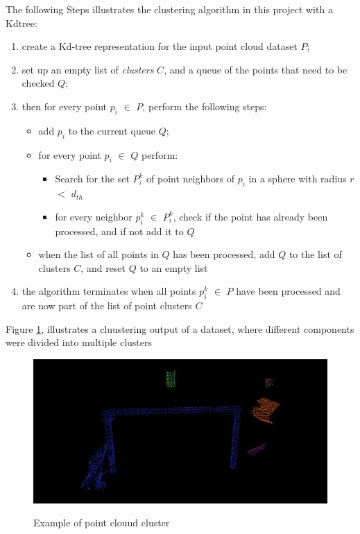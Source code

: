 \documentclass[12pt]{report}
\begin{document}
The following Steps illustrates the clustering algorithm in this project with a Kdtree:

\begin{enumerate}
  \item create a Kd-tree representation for the input point cloud dataset $P$;
  \item set up an empty list of \textit{clusters} $C$, and a queue of the points that need to be checked $Q$;
  \item then for every point $p_i$ $\in$ $P$, perform the following steps:
  \begin{itemize}
    \item add $p_i$ to the current queue $Q$;
    \item for every point $p_i$ $\in$ $Q$ perform:
    \begin{itemize}
      \item Search for the set $P_{i}^{k}$ of point neighbors of $p_i$ in a sphere with radius $r$ $<$ $d_{th}$
      \item for every neighbor $p_{i}^{k}$ $\in$ $P_{i}^{k}$, check if the point has already been processed, and if not add it to $Q$
    \end{itemize}
    \item when the list of all points in $Q$ has been processed, add $Q$ to the list of clusters $C$, and reset $Q$ to an empty list

  \end{itemize}
  \item the algorithm terminates when all points $p_{i}^{k}$ $\in$ $P$ have been processed and are now part of the list of point clusters $C$
\end{enumerate}

Figure \ref{fig:cluster_example}, illustrates a cluustering output of a dataset, where different components were divided into multiple clusters
\begin{figure}[H]%
  \centering
  \includegraphics[width=1\textwidth]{cluster_extraction.jpg}
 \caption{Example of point clouud cluster}\cite[]{Rusu_ICRA2011_PCL}
 \label{fig:cluster_example} 
\end{figure}
\end{document}
